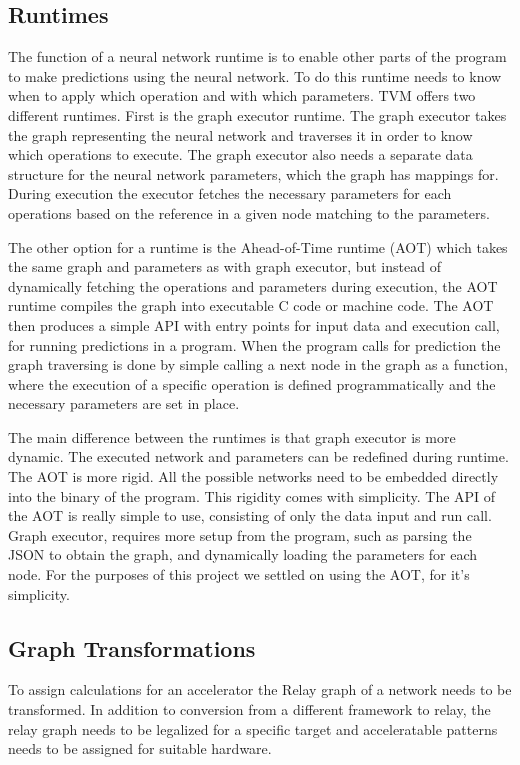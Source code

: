 \documentclass[12pt,a4paper,english
]{tunithesis}
\begin{document}
\subsection{Runtimes}
The function of a neural network runtime is to enable other parts of the program to make predictions using the neural network. To do this runtime needs to know when to apply which operation and with which parameters. TVM offers two different runtimes. First is the graph executor runtime. The graph executor takes the graph representing the neural network and traverses it in order to know which operations to execute. The graph executor also needs a separate data structure for the neural network parameters, which the graph has mappings for. During execution the executor fetches the necessary parameters for each operations based on the reference in a given node matching to the parameters.

The other option for a runtime is the Ahead-of-Time runtime (AOT) which takes the same graph and parameters as with graph executor, but instead of dynamically fetching the operations and parameters during execution, the AOT runtime compiles the graph into executable C code or machine code. The AOT then produces a simple API with entry points for input data and execution call, for running predictions in a program. When the program calls for prediction the graph traversing is done by simple calling a next node in the graph as a function, where the execution of a specific operation is defined programmatically and the necessary parameters are set in place.

The main difference between the runtimes is that graph executor is more dynamic. The executed network and parameters can be redefined during runtime. The AOT is more rigid. All the possible networks need to be embedded directly into the binary of the program. This rigidity comes with simplicity. The API of the AOT is really simple to use, consisting of only the data input and run call. Graph executor, requires more setup from the program, such as parsing the JSON to obtain the graph, and dynamically loading the parameters for each node. For the purposes of this project we settled on using the AOT, for it's simplicity.

\subsection{Graph Transformations}
To assign calculations for an accelerator the Relay graph of a network needs to be transformed. In addition to conversion from a different framework to relay, the relay graph needs to be legalized for a specific target and acceleratable patterns needs to be assigned for suitable hardware.
\end{document}

